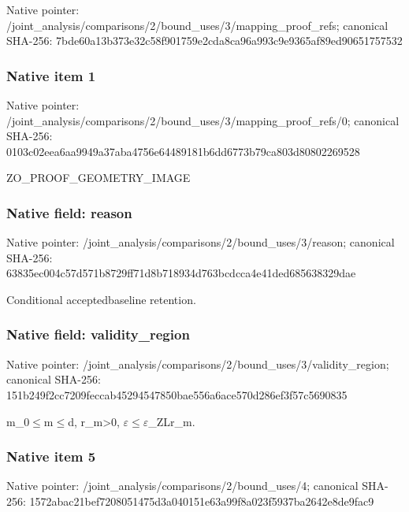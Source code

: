 \documentclass[10pt,a4paper]{article}
\begin{document}
Native pointer: /joint\_analysis/comparis\allowbreak{}ons/2/bound\_uses/3/mappi\allowbreak{}ng\_proof\_refs; canonical SHA-256: 7bde60a13b373e32c58f9017\allowbreak{}59e2cda8ca96a993c9e9365a\allowbreak{}f89ed90651757532



\subsubsection{Native item 1}


Native pointer: /joint\_analysis/comparis\allowbreak{}ons/2/bound\_uses/3/mappi\allowbreak{}ng\_proof\_refs/0; canonical SHA-256: 0103c02eea6aa9949a37aba4\allowbreak{}756e64489181b6dd6773b79c\allowbreak{}a803d80802269528


ZO\_PROOF\_GEOMETRY\_IMAGE


\subsubsection{Native field: reason}


Native pointer: /joint\_analysis/comparis\allowbreak{}ons/2/bound\_uses/3/reaso\allowbreak{}n; canonical SHA-256: 63835ec004c57d571b8729ff\allowbreak{}71d8b718934d763bcdcca4e4\allowbreak{}1ded685638329dae


Conditional acceptedbaseline retention.


\subsubsection{Native field: validity\_region}


Native pointer: /joint\_analysis/comparis\allowbreak{}ons/2/bound\_uses/3/valid\allowbreak{}ity\_region; canonical SHA-256: 151b249f2cc7209feccab452\allowbreak{}94547850bae556a6ace570d2\allowbreak{}86ef3f57c5690835


m\_0\ensuremath{\le}m\ensuremath{\le}d, r\_m>0, \ensuremath{\varepsilon}\ensuremath{\le}\ensuremath{\varepsilon}\_ZLr\_m.


\subsubsection{Native item 5}


Native pointer: /joint\_analysis/comparis\allowbreak{}ons/2/bound\_uses/4; canonical SHA-256: 1572abac21bef7208051475d\allowbreak{}3a040151e63a99f8a023f593\allowbreak{}7ba2642e8de9fac9
\end{document}
